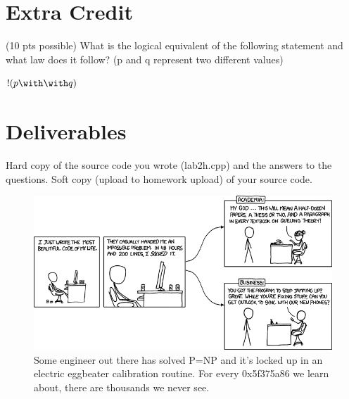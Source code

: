 \documentclass[letterpaper,12pt]{article}
\begin{document}
\section*{Extra Credit}
(10 pts possible) What is the logical equivalent of the following statement and what law does it follow?
    (p and q represent two different values)

    $!( p \with \with q )$
\section*{Deliverables}
Hard copy of the source code you wrote (lab2h.cpp) and the answers to the questions.
Soft copy (upload to homework upload) of your source code.

\begin{figure}[ht!]
	\centering
	\includegraphics[width=5in]{academia_vs_business.png}
    \caption*{Some engineer out there has solved P=NP and it's locked up in an electric eggbeater calibration routine.  For every 0x5f375a86 we learn about, there are thousands we never see.}
\end{figure}
\end{document}

